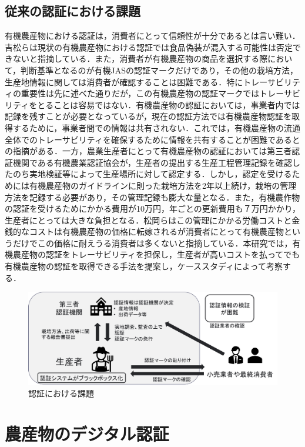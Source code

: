\documentclass[11pt,dvipdfmx]{jreport}
\begin{document}
\section{従来の認証における課題}
有機農産物における認証は，消費者にとって信頼性が十分であるとは言い難い．吉松らは現状の有機農産物における認証では食品偽装が混入する可能性は否定できないと指摘している\cite{2009}．また，消費者が有機農産物の商品を選択する際において，判断基準となるのが有機JASの認証マークだけであり，その他の栽培方法，生産地情報に関しては消費者が確認することは困難である．特にトレーサビリティの重要性は先に述べた通りだが，この有機農産物の認証マークではトレーサビリティをとることは容易ではない．有機農産物の認証においては，事業者内では記録を残すことが必要となっているが，現在の認証方法では有機農産物認証を取得するために，事業者間での情報は共有されない．これでは，有機農産物の流通全体でのトレーサビリティを確保するために情報を共有することが困難であるとの指摘がある\cite{yuuki}．一方，農業生産者にとって有機農産物の認証においては第三者認証機関である有機農業認証協会が，生産者の提出する生産工程管理記録を確認したのち実地検証等によって生産場所に対して認定する．しかし，認定を受けるためには有機農産物のガイドラインに則った栽培方法を2年以上続け，栽培の管理方法を記録する必要があり，その管理記録も膨大な量となる．また，有機農作物の認証を受けるためにかかる費用が10万円，年ごとの更新費用も７万円かかり，生産者にとっては大きな負担となる．松岡らはこの管理にかかる労働コストと金銭的なコストは有機農産物の価格に転嫁されるが消費者にとって有機農産物というだけでこの価格に耐えうる消費者は多くないと指摘している\cite{matsuoka}．本研究では，有機農産物の認証をトレーサビリティを担保し，生産者が高いコストを払ってでも有機農産物の認証を取得できる手法を提案し，ケーススタディによって考察する．

\begin{figure}[t]
	\includegraphics[width=1.0\linewidth]{Haraguchi_fig/blackbox.pdf}
	\caption{認証における課題}
	\label{fig:blackbox}
\end{figure}

\chapter{農産物のデジタル認証}
\end{document}
